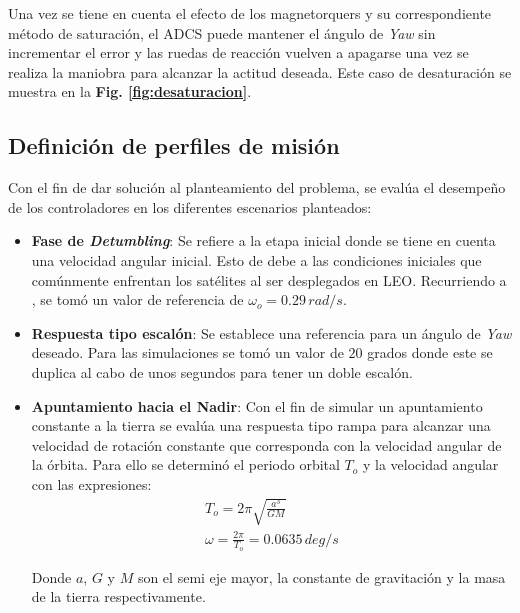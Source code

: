 Una vez se tiene en cuenta el efecto de los magnetorquers y su correspondiente método de saturación, el ADCS puede mantener el ángulo de \textit{Yaw} sin incrementar el error y las ruedas de reacción vuelven a apagarse una vez se realiza la maniobra para alcanzar la actitud deseada. Este caso de desaturación se muestra en la \textbf{Fig. \ref{fig:desaturacion}}.



\newpage
\subsection{Definición de perfiles de misión}
Con el fin de dar solución al planteamiento del problema, se evalúa el desempeño de los controladores en los diferentes escenarios planteados:
\begin{itemize}
	\item \textbf{Fase de \textit{Detumbling}}: Se refiere a la etapa inicial donde se tiene en cuenta una velocidad angular inicial. Esto de debe a las condiciones iniciales que comúnmente enfrentan los satélites al ser desplegados en LEO. Recurriendo a \cite{Ofodile2019}, se tomó un valor de referencia de $\omega_{o} = 0.29\,rad/s$.
	 
	\item \textbf{Respuesta tipo escalón}: Se establece una referencia para un ángulo de \textit{Yaw} deseado. Para las simulaciones se tomó un valor de $20$ grados donde este se duplica al cabo de unos segundos para tener un doble escalón.
	\newpage 
	\item \textbf{Apuntamiento hacia el Nadir}: Con el fin de simular un apuntamiento constante a la tierra se evalúa una respuesta tipo rampa para alcanzar una velocidad de rotación constante que corresponda con la velocidad angular de la órbita. Para ello se determinó el periodo orbital $T_o$ y la velocidad angular con las expresiones:
	\begin{gather}
		T_o = 2\pi\sqrt{\frac{a^3}{GM}}\\
		\omega = \frac{2\pi}{T_o} = 0.0635\,deg/s 
	\end{gather}
	
	Donde $a$, $G$ y $M$ son el semi eje mayor, la constante de gravitación y la masa de la tierra respectivamente.
\end{itemize} 

